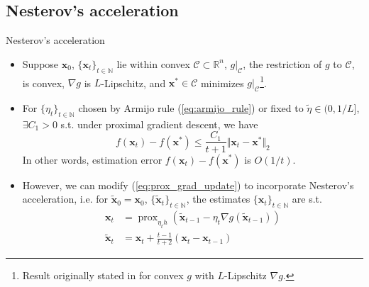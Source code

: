 \documentclass{beamer}
\numberwithin{equation}{section}
\newcommand{\aref}[1]{\alert{\ref{#1}}}
\begin{document}
\subsection{Nesterov's acceleration}

\begin{frame}{Nesterov's acceleration}
    \begin{itemize}
        \item
        Suppose $ \mathbf{x}_0 $, $ \{\mathbf{x}_t\}_{t \in \mathbb{N}} $ lie
        within convex $ \mathcal{C} \subset \mathbb{R}^n $, $ g|_\mathcal{C} $,
        the restriction of $ g $ to $ \mathcal{C} $, is convex, $ \nabla g $
        is $ L $-Lipschitz, and $ \mathbf{x}^* \in \mathcal{C} $ minimizes
        $ g|_\mathcal{C} $\footnote{
            Result originally stated in \cite{stat_learn_sparsity} for convex
            $ g $ with $ L $-Lipschitz $ \nabla g $.
        }.

        \item
        For $ \{\eta_t\}_{t \in \mathbb{N}} $ chosen by Armijo rule
        (\aref{eq:armijo_rule}) or fixed to $ \tilde{\eta} \in (0, 1 / L] $,
        $ \exists C_1 > 0 $ s.t. under proximal gradient descent, we have
        \cite{stat_learn_sparsity}
        \begin{equation} \label{eq:prox_grad_conv}
            f(\mathbf{x}_t) - f(\mathbf{x}^*) \le \frac{C_1}{t + 1}
            \Vert\mathbf{x}_t - \mathbf{x}^*\Vert_2
        \end{equation}
        In other words, estimation error $ f(\mathbf{x}_t) - f(\mathbf{x}^*) $
        is $ O(1 / t) $.

        \item
        However, we can modify (\aref{eq:prox_grad_update}) to incorporate
        Nesterov's acceleration, i.e. for $ \tilde{\mathbf{x}}_0 =
        \mathbf{x}_0 $, $ \{\tilde{\mathbf{x}}_t\}_{t \in \mathbb{N}} $, the
        estimates $ \{\mathbf{x}_t\}_{t \in \mathbb{N}} $ are s.t.
        \cite{stat_learn_sparsity}
        \begin{subequations} \label{eq:prox_grad_update_accel}
            \begin{align}
            \mathbf{x}_t & = \operatorname{prox}_{\eta_t h}(
                \tilde{\mathbf{x}}_{t - 1} - \eta_t\nabla g(
                    \tilde{\mathbf{x}}_{t - 1}
                )
            ) \label{eq:prox_grad_update_accel_a} \\
            \tilde{\mathbf{x}}_t & = \mathbf{x}_t + \frac{t - 1}{t + 2}(
                \mathbf{x}_t - \mathbf{x}_{t - 1}
            ) \label{eq:prox_grad_update_accel_b}
            \end{align}
        \end{subequations}
    \end{itemize}

    \medskip
\end{frame}
\end{document}
